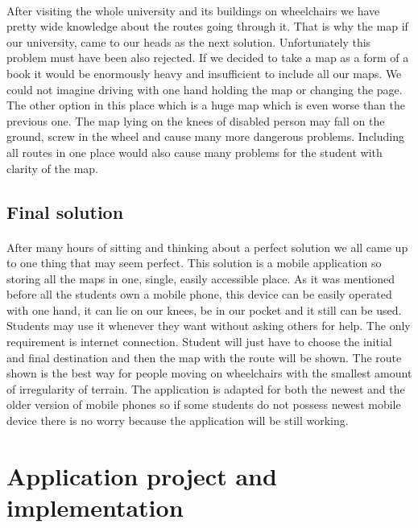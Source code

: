 \documentclass[12pt]{article}
\begin{document}
\paragraph{}After visiting the whole university and its buildings on wheelchairs we have pretty wide knowledge about the routes going through it. That is why the map if our university, came to our heads as the next solution. Unfortunately this problem must have been also rejected. If we decided to take a map as a form of a book it would be enormously heavy and insufficient to include all our maps. We could not imagine driving with one hand holding the map or changing the page. The other option in this place which is a huge map which is even worse than the previous one. The map lying on the knees of disabled person may fall on the ground, screw in the wheel and cause many more dangerous problems. Including all routes in one place would also cause many problems for the student with clarity of the map. 

\subsection{Final solution}
\paragraph{}After many hours of sitting and thinking about a perfect solution we all came up to one thing that may seem perfect. This solution is a mobile application so storing all the maps in one, single,  easily accessible place. As it was mentioned before all the students own a mobile phone, this device can be easily operated with one hand, it can lie on our knees, be in our pocket and it still can be used. Students may use it whenever they want without asking others for help. The only requirement is internet connection.  Student will just have to choose the initial and final destination and then the map with the route will be shown. The route shown is the best way for people moving on wheelchairs with the smallest amount of irregularity of terrain. The application is adapted for both the newest and the older version of mobile phones so if some students do not possess newest mobile device there is no worry because the application will be still working. 
\cleardoublepage

\section{Application project and implementation}
\end{document}
